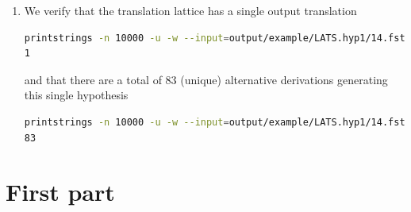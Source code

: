 \documentclass[a4paper,oneside,reqno]{amsart}
\begin{document}
\begin{enumerate}[label=\arabic*.]
  \item We verify that the translation lattice has a single output translation
    \begin{lstlisting}[language=bash]
printstrings -n 10000 -u -w --input=output/example/LATS.hyp1/14.fst.gz -p | sed '/[EMPTY]/d' | wc -l
1
    \end{lstlisting}
    and that there are a total of 83 (unique) alternative derivations generating this
    single hypothesis
    \begin{lstlisting}[language=bash]
printstrings -n 10000 -u -w --input=output/example/LATS.hyp1/14.fst.gz | sed '/[EMPTY]/d' | wc -l
83
    \end{lstlisting}


\end{enumerate}

\section{First part}
\end{document}
